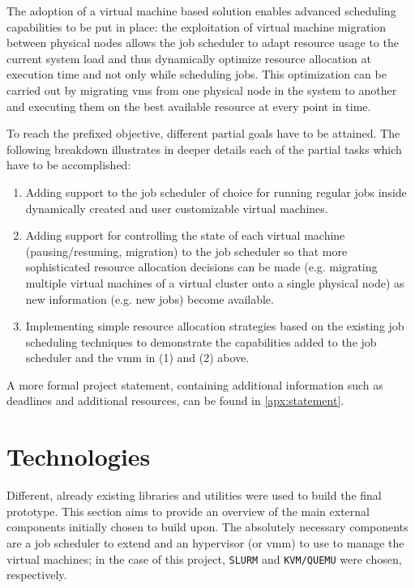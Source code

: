 The adoption of a virtual machine based solution enables advanced scheduling capabilities to be put in place: the exploitation of virtual machine migration between physical nodes allows the job scheduler to adapt resource usage to the current system load and thus dynamically optimize resource allocation at execution time and not only while scheduling jobs. This optimization can be carried out by migrating \glspl{vm} from one physical node in the system to another and executing them on the best available resource at every point in time.

To reach the prefixed objective, different partial goals have to be attained. The following breakdown illustrates in deeper details each of the partial tasks which have to be accomplished:

\begin{enumerate}
	\item Adding support to the job scheduler of choice for running regular jobs inside dynamically created and user customizable virtual machines.
	\item Adding support for controlling the state of each virtual machine (pausing/resuming, migration) to the job scheduler so that more sophisticated resource allocation decisions can be made (e.g. migrating multiple virtual machines of a virtual cluster onto a single physical node) as new information (e.g. new jobs) become available.
	\item Implementing simple resource allocation strategies based on the existing job scheduling techniques to demonstrate the capabilities added to the job scheduler and the \gls{vmm} in (1) and (2) above.
\end{enumerate}

A more formal project statement, containing additional information such as deadlines and additional resources, can be found in \autoref{apx:statement}.



\section{Technologies}
\label{sec:tech}

Different, already existing libraries and utilities were used to build the final prototype. This section aims to provide an overview of the main external components initially chosen to build upon. The absolutely necessary components are a job scheduler to extend and an \gls{hypervisor} (or \gls{vmm}) to use to manage the virtual machines; in the case of this project, \texttt{SLURM} and \texttt{KVM/QUEMU} were chosen, respectively.

